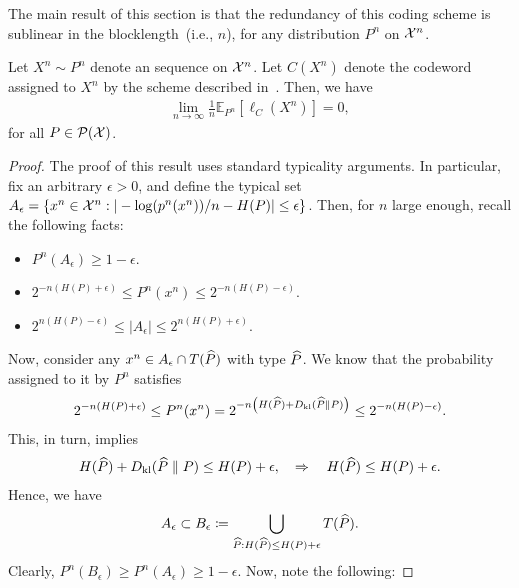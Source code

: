     The main result of this section is that the redundancy of this coding scheme is sublinear in the blocklength~(i.e., $n$), for any \iid distribution $P^n$ on $\mathcal{X}^n$. 
    \begin{proposition}
        \label{prop:universal-typical-code} Let $X^n \sim P^n$ denote an \iid sequence on $\mathcal{X}^n$. Let $C(X^n)$ denote the codeword assigned to $X^n$ by the scheme described in~. Then, we have 
        \begin{align}
            \lim_{n \to \infty} \frac{1}{n} \mathbb{E}_{P^n}[\ell_C(X^n)] = 0, 
        \end{align}
        for all $P \in \mathcal{P}(\mathcal{X})$. 
    \end{proposition}

    \begin{proof}
        The proof of this result uses standard typicality arguments. In particular, fix an arbitrary $\epsilon >0$, and define the typical set $A_\epsilon = \{ x^n \in \mathcal{X}^n: |-\log(p^n(x^n))/n - H(P)| \leq \epsilon\}$. Then, for $n$ large enough, recall the following facts: 
        \begin{itemize}
            \item $P^n(A_\epsilon) \geq 1- \epsilon$. 
            \item $2^{-n(H(P) + \epsilon)} \leq P^n(x^n) \leq 2^{- n (H(P) - \epsilon)}$. 
            \item $2^{n(H(P) - \epsilon)} \leq |A_{\epsilon}| \leq 2^{n(H(P)+ \epsilon)}$. 
        \end{itemize}
        Now, consider any $x^n \in A_\epsilon \cap T(\widehat{P})$ with type $\widehat{P}$.  We know that the probability assigned to it by $P^n$ satisfies
        \begin{align}
            2^{-n (H(P) +\epsilon)}  \leq P^n(x^n) = 2^{-n \left( H(\widehat{P}) + D_{\text{kl}}(\widehat{P} \parallel P) \right)} \leq 2^{-n (H(P) -\epsilon)}. 
        \end{align}
        This, in turn, implies 
        \begin{align}
            H(\widehat{P}) + D_{\text{kl}}(\widehat{P} \parallel P) \leq H(P) + \epsilon, \quad \Rightarrow \quad H(\widehat{P})  \leq H(P) + \epsilon. 
        \end{align}
        Hence, we have 
        \begin{align}
            A_\epsilon \subset B_\epsilon \coloneqq \bigcup_{\widehat{P}: H(\widehat{P}) \leq H(P) + \epsilon} T(\widehat{P}). 
        \end{align}
        Clearly, $P^n(B_\epsilon) \geq P^n(A_\epsilon) \geq 1-\epsilon$. Now, note the following: 

\end{proof}
